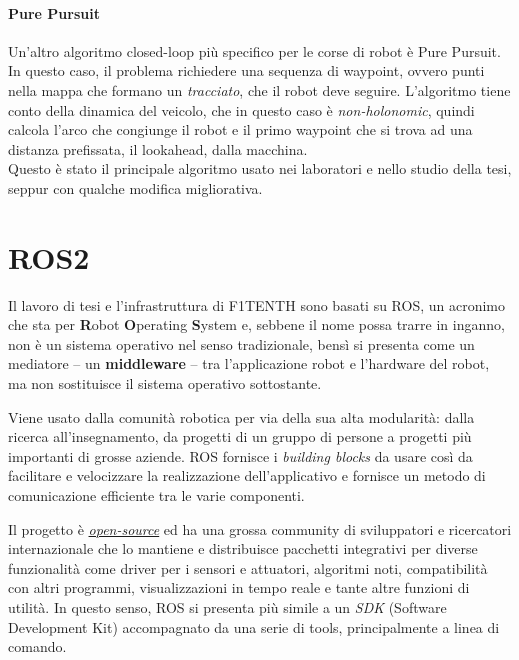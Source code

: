 \paragraph{Pure Pursuit} 
\label{par:pp}
Un'altro algoritmo closed-loop più specifico per le corse di robot è Pure Pursuit.\cite{lection10} In questo caso, il
problema richiedere una sequenza di waypoint, ovvero punti nella mappa che formano un \textit{tracciato},
che il robot deve seguire. L'algoritmo tiene conto della dinamica del veicolo, che in questo caso è
\textit{non-holonomic}, quindi calcola l'arco che congiunge il robot e il primo waypoint che si trova ad
una distanza prefissata, il lookahead, dalla macchina.\\
Questo è stato il principale algoritmo usato nei laboratori e nello studio della tesi, seppur con qualche
modifica migliorativa.


\section{ROS2}
\label{sec:ros}
Il lavoro di tesi e l'infrastruttura di F1TENTH sono basati su ROS, un acronimo che sta per
\textbf{R}obot \textbf{O}perating \textbf{S}ystem e, sebbene il nome possa trarre in inganno, non è un
sistema operativo nel senso tradizionale, bensì si presenta come un mediatore -- un \textbf{middleware}
-- tra l'applicazione robot e l'hardware del robot, ma non sostituisce il sistema operativo sottostante.
\cite{ros-ecosystem, scirobotics}

Viene usato dalla comunità robotica per via della sua alta modularità:
dalla ricerca all'insegnamento, da progetti di un gruppo di persone a progetti più importanti
di grosse aziende. ROS fornisce i \textit{building blocks} da usare così da facilitare e velocizzare
la realizzazione dell'applicativo e fornisce un metodo di comunicazione efficiente tra le varie componenti.

Il progetto è \href{https://github.com/ros}{\textit{open-source}} ed ha una grossa community di
sviluppatori e ricercatori internazionale che lo mantiene e distribuisce pacchetti integrativi per
diverse funzionalità come driver per i sensori e attuatori, algoritmi noti, compatibilità con altri
programmi, visualizzazioni in tempo reale e tante altre funzioni di utilità. In questo senso, ROS si
presenta più simile a un \textit{SDK} (Software Development Kit) accompagnato da una serie di tools,
principalmente a linea di comando.

